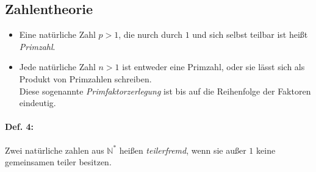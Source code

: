 \subsection{Zahlentheorie}
\begin{itemize}
\item Eine natürliche Zahl $p>1$, die nurch durch $1$ und sich selbst teilbar ist heißt \emph{Primzahl}.
\item Jede natürliche Zahl $n>1$ ist entweder eine Primzahl, oder sie lässt sich als Produkt von Primzahlen schreiben.\\
Diese sogenannte \emph{Primfaktorzerlegung} ist bis auf die Reihenfolge der Faktoren eindeutig.
\end{itemize}

\paragraph{Def. 4:}\parskp
Zwei natürliche zahlen aus $\mathbb{N}^*$ heißen \emph{teilerfremd}, wenn sie außer $1$ keine gemeinsamen teiler besitzen.
